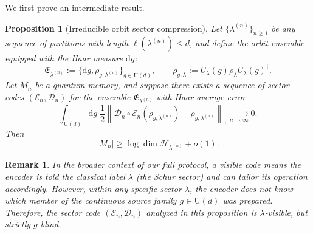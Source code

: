 \documentclass[a4paper,onecolumn,11pt]{quantumarticle}
\newtheorem{prop}{Proposition}
\newtheorem{rem}{Remark}
\newcommand{\dd}{\mathrm{d}}
\def\h{\mathcal{H}}
\begin{document}
We first prove an intermediate result.
\begin{prop}[Irreducible orbit sector compression]\label{prop:orbit_sector_converse}
Let $\{\lambda^{(n)}\}_{n\ge 1}$ be any sequence of partitions with length $\ell(\lambda^{(n)})\le d$, and define the orbit ensemble equipped with the Haar measure $\dd g$:
\begin{equation}
    \mathfrak E_{\lambda^{(n)}} :=  \{\dd g,\rho_{g,\lambda^{(n)}}\}_{g\in \mathrm U(d)},
    \qquad
    \rho_{g,\lambda}:= U_\lambda(g)\rho_\lambda U_\lambda(g)^\dagger .
\end{equation}
Let $M_n$ be a quantum memory, and suppose there exists a sequence of sector codes $(\mathcal E_n,\mathcal D_n)$ for the ensemble $\mathfrak E_{\lambda^{(n)}}$ with Haar-average error
\begin{equation}
    \int_{\mathrm U(d)} \dd g\;
    \frac12\left\|
        \mathcal D_n\circ \mathcal E_n(\rho_{g,\lambda^{(n)}})
        - \rho_{g,\lambda^{(n)}}
    \right\|_1
    \xrightarrow[n\to\infty]{}0 .
\end{equation}
Then
\begin{equation}
    |M_n| \ge \log \dim \h_{\lambda^{(n)}} + o(1).
\end{equation}
\end{prop}

\begin{rem}
    In the broader context of our full protocol, a \emph{visible} code means the encoder is told the classical label $\lambda$ (the Schur sector) and can tailor its operation accordingly. However, within any specific sector $\lambda$, the encoder does not know which member of the continuous source family $g \in \mathrm{U}(d)$ was prepared. Therefore, the sector code $(\mathcal E_n,\mathcal D_n)$ analyzed in this proposition is $\lambda$-\emph{visible}, but strictly $g$-\emph{blind}.
\end{rem}
\end{document}
